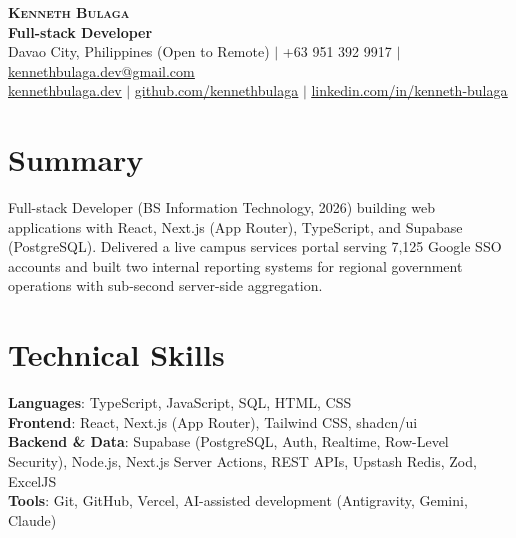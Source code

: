 \documentclass[a4paper,11pt]{article}
\begin{document}
\begin{center}
    \textbf{\Huge \scshape Kenneth Bulaga} \\ \vspace{2pt}
    \textbf{\large Full-stack Developer} \\ \vspace{2pt}
    \small Davao City, Philippines (Open to Remote) $|$ +63 951 392 9917 $|$ \href{mailto:kennethbulaga.dev@gmail.com}{\underline{kennethbulaga.dev@gmail.com}} \\ \vspace{1pt}
    \href{https://kennethbulaga.dev}{\underline{kennethbulaga.dev}} $|$
    \href{https://github.com/kennethbulaga}{\underline{github.com/kennethbulaga}} $|$
    \href{https://www.linkedin.com/in/kenneth-bulaga}{\underline{linkedin.com/in/kenneth-bulaga}}
\end{center}

\section{Summary}
\small{Full-stack Developer (BS Information Technology, 2026) building web applications with React, Next.js (App Router), TypeScript, and Supabase (PostgreSQL). Delivered a live campus services portal serving 7,125 Google SSO accounts and built two internal reporting systems for regional government operations with sub-second server-side aggregation.}

\section{Technical Skills}
 \begin{itemize}[leftmargin=0.15in, label={}]
    \small{\item{
     \textbf{Languages}{: TypeScript, JavaScript, SQL, HTML, CSS} \\
     \textbf{Frontend}{: React, Next.js (App Router), Tailwind CSS, shadcn/ui} \\
     \textbf{Backend \& Data}{: Supabase (PostgreSQL, Auth, Realtime, Row-Level Security), Node.js, Next.js Server Actions, REST APIs, Upstash Redis, Zod, ExcelJS} \\
     \textbf{Tools}{: Git, GitHub, Vercel, AI-assisted development (Antigravity, Gemini, Claude)}
    }}
 \end{itemize}

\end{document}
